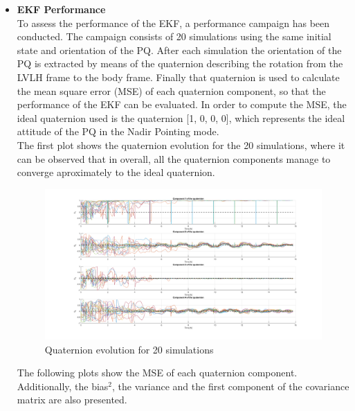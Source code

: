 \begin{itemize}
    \item \textbf{EKF Performance}\\
    To assess the performance of the EKF, a performance campaign has been conducted. The campaign consists of 20 simulations using the same
    initial state and orientation of the PQ. After each simulation the orientation of the PQ is extracted by means of the quaternion
    describing the rotation from the LVLH frame to the body frame. Finally that quaternion is used to calculate
    the mean square error (MSE) of each quaternion component, so that the performance of the EKF can be evaluated. In order to compute the MSE, the ideal
    quaternion used is the quaternion [1, 0, 0, 0], which represents the ideal attitude of the PQ in the Nadir Pointing mode.\\
    
    The first plot shows the quaternion evolution for the 20 simulations, where it can be observed that in overall, all the quaternion components
    manage to converge aproximately to the ideal quaternion.

    \begin{figure}[H]
        \centering
        \includegraphics[width=1\linewidth]{res/img/Nadir_EKF/EKF_performance/20_SIM_quat.png}
        \caption{Quaternion evolution for 20 simulations}
        \label{fig:EKF_20_SIM_quat}
    \end{figure}

    The following plots show the MSE of each quaternion component. Additionally, the bias$^2$, the variance and the first component
    of the covariance matrix are also presented.


\end{itemize}
